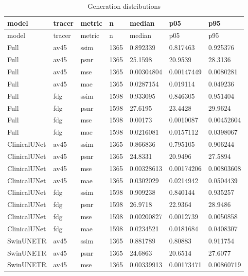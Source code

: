 \begingroup
\footnotesize
\setlength{\tabcolsep}{4pt}
\begin{longtable}{lllllll}
\caption{Generation distributions}\label{tab:s-n02}\\
\toprule
model & tracer & metric & n & median & p05 & p95 \\
\midrule
\endfirsthead
\toprule
model & tracer & metric & n & median & p05 & p95 \\
\midrule
\endhead
\bottomrule
\endfoot
Full & av45 & ssim & 1365 & 0.892339 & 0.817463 & 0.925376 \\
Full & av45 & psnr & 1365 & 25.1598 & 20.9539 & 28.3136 \\
Full & av45 & mse & 1365 & 0.00304804 & 0.00147449 & 0.0080281 \\
Full & av45 & mae & 1365 & 0.0287154 & 0.019114 & 0.049236 \\
Full & fdg & ssim & 1598 & 0.933095 & 0.846305 & 0.951404 \\
Full & fdg & psnr & 1598 & 27.6195 & 23.4428 & 29.9624 \\
Full & fdg & mse & 1598 & 0.00173 & 0.0010087 & 0.00452604 \\
Full & fdg & mae & 1598 & 0.0216081 & 0.0157112 & 0.0398067 \\
ClinicalUNet & av45 & ssim & 1365 & 0.866836 & 0.795105 & 0.906244 \\
ClinicalUNet & av45 & psnr & 1365 & 24.8331 & 20.9496 & 27.5894 \\
ClinicalUNet & av45 & mse & 1365 & 0.00328613 & 0.00174206 & 0.00803608 \\
ClinicalUNet & av45 & mae & 1365 & 0.0302029 & 0.0214942 & 0.0504439 \\
ClinicalUNet & fdg & ssim & 1598 & 0.909238 & 0.840144 & 0.935257 \\
ClinicalUNet & fdg & psnr & 1598 & 26.9718 & 22.9364 & 28.9486 \\
ClinicalUNet & fdg & mse & 1598 & 0.00200827 & 0.0012739 & 0.0050858 \\
ClinicalUNet & fdg & mae & 1598 & 0.0234521 & 0.0181684 & 0.0408307 \\
SwinUNETR & av45 & ssim & 1365 & 0.881789 & 0.80883 & 0.911754 \\
SwinUNETR & av45 & psnr & 1365 & 24.6863 & 20.6514 & 27.6077 \\
SwinUNETR & av45 & mse & 1365 & 0.00339913 & 0.00173471 & 0.00860719 \\

\end{longtable}
